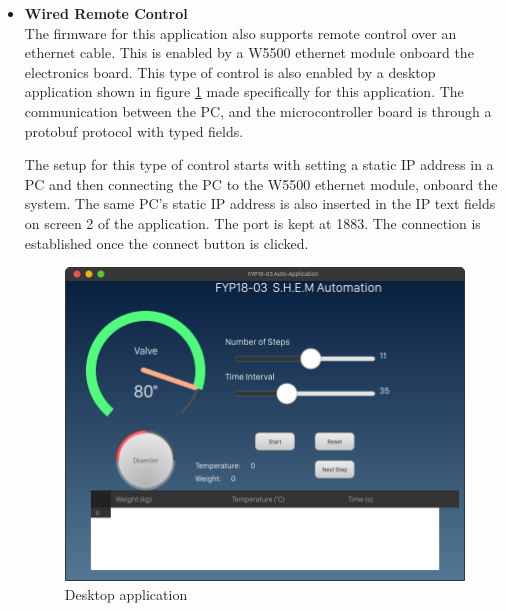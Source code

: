 \begin{itemize}
    \item \textbf{Wired Remote Control}\\
    The firmware for this application also supports remote control over an ethernet cable. This is enabled by a W5500 ethernet module onboard the electronics board. This type of control is also enabled by a desktop application shown in figure \ref{fig:desktop_application} made specifically for this application.
    The communication between the PC, and the microcontroller board is through a protobuf protocol with typed fields.
    \par
    The setup for this type of control starts with setting a static IP address in a PC and then connecting the PC to the W5500 ethernet module, onboard the system. The same PC's static IP address is also inserted in the IP text fields on screen 2 of the application.  The port is kept at 1883. The connection is established once the connect button is clicked.
    \begin{figure}[H]
        \centering
        \includegraphics[width=\textwidth]{Figures/desktop_v1.png}
        \caption{Desktop application }
        \label{fig:desktop_application}
    \end{figure}
\end{itemize}